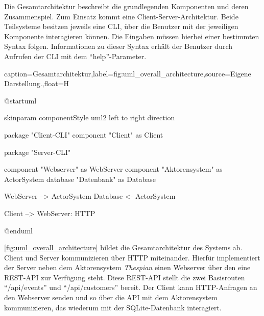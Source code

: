 Die Gesamtarchitektur beschreibt die grundlegenden Komponenten und deren Zusammenspiel.
Zum Einsatz kommt eine Client-Server-Architektur.
Beide Teilsysteme besitzen jeweils eine \ac{CLI}, über die Benutzer mit der jeweiligen Komponente interagieren können.
Die Eingaben müssen hierbei einer bestimmten Syntax folgen.
Informationen zu dieser Syntax erhält der Benutzer durch Aufrufen der \ac{CLI} mit dem \enquote{help}-Parameter.

\begin{dhbwfigure}{caption=Gesamtarchitektur,label=fig:uml_overall_architecture,source={Eigene Darstellung.},float=H}
    \begin{plantuml}
        @startuml

            skinparam componentStyle uml2
            left to right direction

            package "Client-CLI" {
                component "Client" as Client
            }

            package "Server-CLI" {
                component "Webserver" as WebServer
                component "Aktorensystem" as ActorSystem
                database "Datenbank" as Database

                WebServer --> ActorSystem
                Database <- ActorSystem
            }

            Client --> WebServer: HTTP

        @enduml
    \end{plantuml}
\end{dhbwfigure}\unskip

\autoref{fig:uml_overall_architecture} bildet die Gesamtarchitektur des Systems ab.
Client und Server kommunizieren über \ac{HTTP} miteinander.
Hierfür implementiert der Server neben dem Aktorensystem \textit{Thespian} einen Webserver über den eine \ac{REST}-\ac{API} zur Verfügung steht.
Diese \ac{REST}-\ac{API} stellt die zwei Basisrouten \enquote{/api/events} und \enquote{/api/customers} bereit.
Der Client kann \ac{HTTP}-Anfragen an den Webserver senden und so über die \ac{API} mit dem Aktorensystem kommunizieren, das wiederum mit der SQLite-Datenbank interagiert. 
